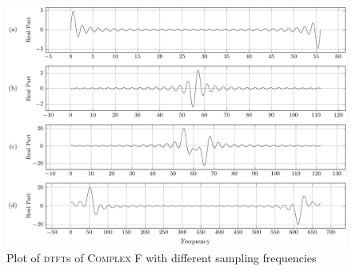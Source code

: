 \documentclass[../../course]{subfiles}
\begin{document}
\vfill

\begin{figure} [H]
    \centering
     {
        \includegraphics[height = 0.8\textheight] {tikzpics/plotDtftComplexF64.pdf}
    }
     {Plot of \textsc{dtft}s of \textsc{Complex F} with different sampling frequencies}
    \label{plt:dtftCplxF64}
\end{figure}

\pagebreak




%
%
%
%
%
%
%
\end{document}
